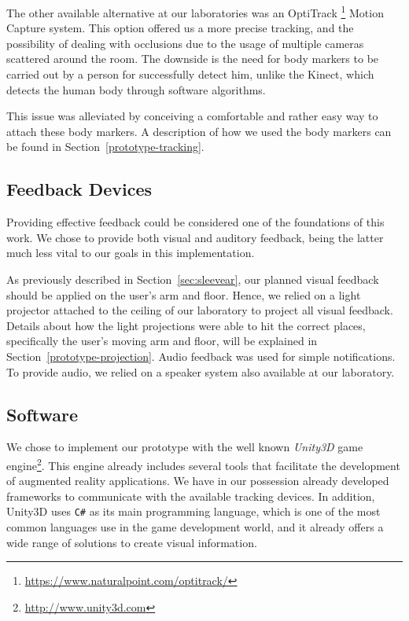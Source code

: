 The other available alternative at our laboratories was an OptiTrack \footnote{\url{https://www.naturalpoint.com/optitrack/}} Motion Capture system. 
This option offered us a more precise tracking, and the possibility of dealing with occlusions due to the usage of multiple cameras scattered around the room. 
The downside is the need for body markers to be carried out by a person for successfully detect him, unlike the 
Kinect, which detects the human body through software algorithms. 

This issue was alleviated by conceiving a comfortable and rather easy way to attach these body markers. A description of how we used the body markers can be found in Section~\ref{prototype-tracking}.


\subsection{Feedback Devices}

Providing effective feedback could be considered one of the foundations of this work. 
We chose to provide both visual and auditory feedback, being the latter much less vital to our goals in this implementation.

As previously described in Section~\ref{sec:sleevear}, our planned visual feedback should be applied on the user's arm and floor. Hence, we relied on a light projector attached to the ceiling of our laboratory to project all visual feedback.
Details about how the light projections were able to hit the correct places, specifically the user's moving arm and floor, will be explained in Section~\ref{prototype-projection}.
Audio feedback was used for simple notifications.
To provide audio, we relied on a speaker system also available at our laboratory.

\subsection{Software}

We chose to implement our prototype with the well known \emph{Unity3D} game engine\footnote{\url{http://www.unity3d.com}}.
This engine already includes several tools that facilitate the development of augmented reality applications. We have in our possession already developed frameworks to communicate with the available tracking devices. In addition, Unity3D uses \texttt{C\#} as its main programming language, which is one of the most common languages use in the game development world, and it already offers a wide range of solutions to create visual information.

